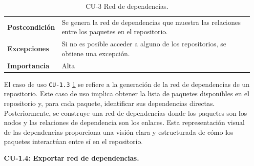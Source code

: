 \begin{table}[p]
\begin{tabularx}{\linewidth}{ p{} p{} }
		\textbf{Postcondición}        & Se genera la red de dependencias que muestra las relaciones entre los paquetes en el repositorio.                        \\
		\textbf{Excepciones}          & Si no es posible acceder a alguno de los repositorios, se obtiene una excepción.                                         \\
		\textbf{Importancia}          & Alta                                                                                                                     \\
		\bottomrule
	\end{tabularx}
	\caption{CU-3 Red de dependencias.}
	\label{tab:cu3}
\end{table}

El caso de uso \texttt{CU-1.3} \ref{tab:cu3} se refiere a la generación de la red de dependencias de un repositorio. Este caso de uso
implica obtener la lista de paquetes disponibles en el repositorio y, para cada paquete, identificar sus
dependencias directas. Posteriormente, se construye una red de dependencias donde los paquetes son los nodos
y las relaciones de dependencia son los enlaces. Esta representación visual de las dependencias proporciona
una visión clara y estructurada de cómo los paquetes interactúan entre sí en el repositorio.



\textbf{CU-1.4: Exportar red de dependencias.}

